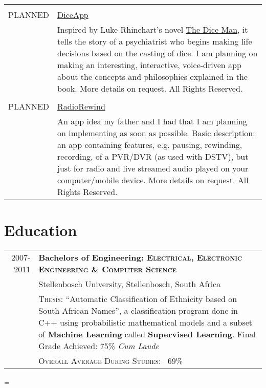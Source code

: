 \documentclass[a4paper,10pt,notitlepage]{article}
\newenvironment{absolutelynopagebreak}
  {\par\nobreak\vfil\penalty0\vfilneg
   \vtop\bgroup}
  {\par\xdef\tpd{\the\prevdepth}\egroup
   \prevdepth=\tpd}
\begin{document}
\begin{absolutelynopagebreak}
\begin{tabular}{r|p{11cm}}
		\multicolumn{2}{c}{} \\
		\textsc{PLANNED}            &                                                                                                                  
		\href{www.laurcode.com}{DiceApp}\\&\footnotesize{Inspired by Luke Rhinehart’s novel \href{https://en.wikipedia.org/wiki/The_Dice_Man}{The Dice Man}, it tells the story of a psychiatrist who begins making life decisions based on the casting of dice. I am planning on making an interesting, interactive, voice-driven app about the concepts and philosophies explained in the book. More details on request. All Rights Reserved.} \\
		
		\multicolumn{2}{c}{} \\
		\textsc{PLANNED}            &                                                                                                                  
		\href{www.laurcode.com}{RadioRewind}\\&\footnotesize{An app idea my father and I had that I am planning on implementing as soon as possible. Basic description: an app containing features, e.g. pausing, rewinding, recording, of a PVR/DVR (as used with DSTV), but just for radio and live streamed audio played on your computer/mobile device. More details on request. All Rights Reserved.} \\
		
	\end{tabular}
	
	\section{Education}
	\begin{tabular}{r|p{11cm}}
		
		\textsc{2007-2011} & \textbf{Bachelors of Engineering: \textsc{Electrical, Electronic Engineering \& Computer Science}} \\
		& Stellenbosch University, Stellenbosch, South Africa \\
		& \textsc{Thesis}: ``Automatic Classification of Ethnicity based on South African Names'', a classification program done in C++ using probabilistic mathematical models and a subset of \textbf{Machine Learning} called \textbf{Supervised Learning}. \small Final Grade Achieved: 75\% \textit{Cum Laude} \\
		&\normalsize \textsc{Overall Average During Studies}: ~69\% \\
		

\end{tabular}
\end{absolutelynopagebreak}
\end{document}
